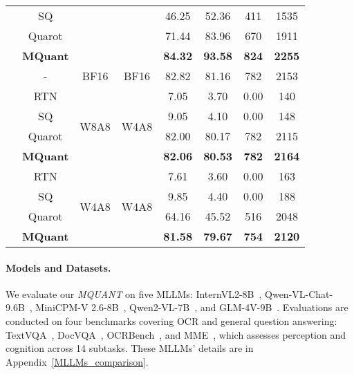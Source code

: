 \begin{table}[t]
{\begin{tabular}{c|c|cc|cccc}
  & SQ &  & &  46.25 &52.36 &411 &1535 \\
  & Quarot &  & & 71.44 & 83.96 & 670 & 1911 \\
  \rowcolor{gray!25}
  \cellcolor{white} & \textbf{MQuant} &  & & \textbf{84.32} & \textbf{93.58} &\textbf{824} &\textbf{2255} \\
\midrule
\rowcolor{gray!12}
\cellcolor{white}& - & BF16 & BF16 & 82.82 &81.16 &782 &2153 \\
& RTN &\multirow{4}{*}{W8A8} &\multirow{4}{*}{W4A8}&  7.05 &3.70 &0.00 &140 \\
  & SQ &  & &  9.05 &4.10 &0.00 &148 \\
  & Quarot  &  & & 82.00 &80.17 &782 &2115 \\
  \rowcolor{gray!25}
  \cellcolor{white}{GLM-4V} & \textbf{MQuant} &  & & \textbf{82.06} &\textbf{80.53} &\textbf{782} &\textbf{2164} \\ \cline{2-8}
  \cellcolor{white}{-9B}& RTN & \multirow{4}{*}{W4A8} &\multirow{4}{*}{W4A8} &7.61 &3.60 &0.00 &163 \\
  & SQ &  & &  9.85 &4.40 &0.00 &188 \\
  & Quarot &  & & 64.16 &45.52 &516 &2048 \\
  \rowcolor{gray!25}
  \cellcolor{white} & \textbf{MQuant} &  & & \textbf{81.58} & \textbf{79.67} &\textbf{754} &\textbf{2120} \\
\bottomrule
\end{tabular}
}
\vspace{-8mm}
\end{table}

\paragraph{Models and Datasets.} We evaluate our \emph{MQUANT} on five MLLMs: InternVL2-8B~\citep{internvl15}, Qwen-VL-Chat-9.6B~\citep{qwenvl}, MiniCPM-V 2.6-8B~\citep{yao2024minicpmv}, Qwen2-VL-7B~\citep{Qwen2VL}, and GLM-4V-9B~\citep{CogVLM2}. Evaluations are conducted on four benchmarks covering OCR and general question answering: TextVQA~\citep{singh2019textvqa}, DocVQA~\citep{mathew2021docvqa}, OCRBench~\citep{liu2023ocrbench}, and MME~\citep{fu2023mme}, which assesses perception and cognition across 14 subtasks. These MLLMs' details are in Appendix~\ref{MLLMs_comparison}.

